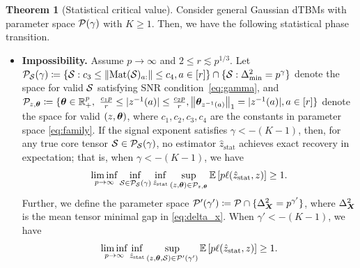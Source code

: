 \documentclass[journal]{IEEEtran}
\theoremstyle{definition}
\newtheorem{thm}{Theorem}
\theoremstyle{definition}
\begin{document}
\begin{thm}[Statistical critical value]\label{thm:stats} Consider general Gaussian dTBMs with parameter space $\mathcal{P}(\gamma)$ with $K\geq 1$. Then, we have the following statistical phase transition. 

\begin{itemize}[wide]
    \item 
    \textbf{Impossibility.}  {Assume $p \rightarrow \infty$ and $2 \leq r\lesssim p^{1/3}$.} Let $\mathcal{P}_{\mathcal{S}}(\gamma) \coloneqq \{ \mathcal{S}: c_3\leq \lVert\text{Mat}(\mathcal{S})_{a:}\rVert\leq c_4, a\in[r]\} \cap \{ \mathcal{S}: \Delta_{\min}^2 = p^{\gamma}\}$ denote the space for valid $\mathcal{S}$ satisfying SNR condition~\eqref{eq:gamma}, and $\tP_{z ,\mtheta} \coloneqq \{ \mtheta\in\mathbb{R}^p_{+},\ 
{c_1p\over r}\leq |z^{-1}(a)|\leq {c_2 p\over r}, \onorm{\mtheta_{z^{-1}(a)}}_1=|z^{-1}(a)|, a \in [r] \}$ denote the space for valid $(z, \boldsymbol{\theta})$,  where $c_1, c_2, c_3, c_4$ are the constants in parameter space \eqref{eq:family}. If the signal exponent satisfies $\gamma < -(K-1)$, then, for any true core tensor $\mathcal{S} \in \mathcal{P}_{\mathcal{S}}(\gamma)$, no estimator $\hat z_{\text{stat}}$ achieves exact recovery in expectation; that is, when $\gamma< -(K-1)$, we have 
    \begin{equation}\label{eq:minminmax}
   \liminf_{p \rightarrow \infty}\inf_{\tS \in  \tP_{\tS}(\gamma)}  \inf_{\hat z_{\text{stat}}}\sup_{ (z, \mtheta) \in \tP_{z, \mtheta}} \bbE \left[ p\ell(\hat z_{\text{stat}}, z) \right]\geq 1.
\end{equation}
{ 
    Further, we define the parameter space $\mathcal{P}'(\gamma') \coloneqq \mathcal{P}\cap \{ \Delta_{\bm X}^2 = p^{\gamma'} \}$, where $\Delta_{\bm X}^2$ is the mean tensor minimal gap in \eqref{eq:delta_x}. When $\gamma' < -(K-1)$, we have 
    \begin{equation}
        \liminf_{p \rightarrow \infty} \inf_{\hat z_{\rm stat}} \sup_{(z, \boldsymbol{\theta}, \mathcal{S}) \in \mathcal{P}'(\gamma')}  \mathbb{E} \left[ p\ell(\hat z_{\text{stat}}, z) \right]\geq 1.
    \end{equation}
    }

    
    

\end{itemize}
\end{thm}
\end{document}
